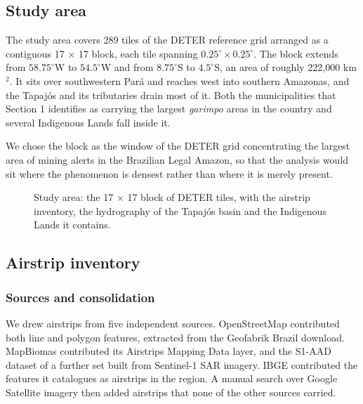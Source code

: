 \documentclass[11pt]{article}
\begin{document}
\subsection{Study area}

The study area covers 289 tiles of the DETER reference grid arranged as a contiguous 17 $\times$ 17 block, each tile spanning $0.25^\circ \times 0.25^\circ$. The block extends from $58.75^\circ$W to $54.5^\circ$W and from $8.75^\circ$S to $4.5^\circ$S, an area of roughly 222{,}000 km$^2$. It sits over southwestern Par\'a and reaches west into southern Amazonas, and the Tapaj\'os and its tributaries drain most of it. Both the municipalities that Section 1 identifies as carrying the largest \textit{garimpo} areas in the country and several Indigenous Lands fall inside it.

We chose the block as the window of the DETER grid concentrating the largest area of mining alerts in the Brazilian Legal Amazon, so that the analysis would sit where the phenomenon is densest rather than where it is merely present.


\begin{figure}[htbp]
\centering
\caption{Study area: the 17 $\times$ 17 block of DETER tiles, with the airstrip inventory, the hydrography of the Tapaj\'os basin and the Indigenous Lands it contains.}
\label{fig:study_area}
\end{figure}

\subsection{Airstrip inventory}

\subsubsection{Sources and consolidation}

We drew airstrips from five independent sources. OpenStreetMap contributed both line and polygon features, extracted from the Geofabrik Brazil download. MapBiomas contributed its Airstrips Mapping Data layer, and the S1-AAD dataset of \citet{gomes2026} a further set built from Sentinel-1 SAR imagery. IBGE contributed the features it catalogues as airstrips in the region. A manual search over Google Satellite imagery then added airstrips that none of the other sources carried.
\end{document}

